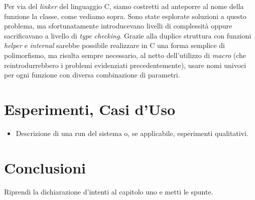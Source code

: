 \documentclass[noexaminfo]{sapthesis}
\begin{document}
Per via del \textit{linker} del linguaggio C, siamo costretti ad anteporre al nome della funzione la classe, come vediamo sopra. Sono state esplorate soluzioni a questo problema, ma sfortunatamente introducevano livelli di complessità oppure sacrificavano a livello di \textit{type checking}. Grazie alla duplice struttura con funzioni \textit{helper} e \textit{internal} sarebbe possibile realizzare in C una forma semplice di polimorfismo, ma risulta sempre necessario, al netto dell’utilizzo di \textit{macro} (che reintrodurrebbero i problemi evidenziati precedentemente), usare nomi univoci per ogni funzione con diversa combinazione di parametri.

\chapter{Esperimenti, Casi d’Uso}

\begin{itemize}
  \item Descrizione di una run del sistema o, se applicabile, esperimenti qualitativi.
\end{itemize}

\chapter{Conclusioni}

Riprendi la dichiarazione d’intenti al capitolo uno e metti le spunte.

\backmatter
\cleardoublepage
\end{document}
